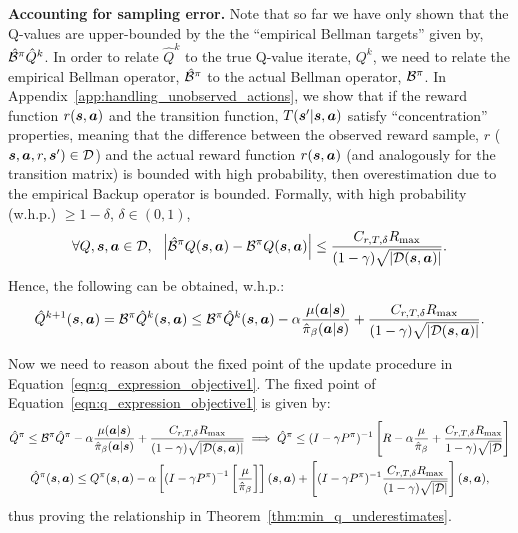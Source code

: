 \textbf{Accounting for sampling error.} Note that so far we have only shown that the Q-values are upper-bounded by the the ``empirical Bellman targets'' given by, $\hat{\mathcal{B}}^\pi \hat{Q}^k$. In order to relate $\hat{Q}^k$ to the true Q-value iterate, $Q^k$, we need to relate the empirical Bellman operator, $\hat{\mathcal{B}}^\pi$ to the actual Bellman operator, $\mathcal{B}^\pi$. In Appendix~\ref{app:handling_unobserved_actions}, we show that if the reward function $r(\boldsymbol{s}, \boldsymbol{a})$ and the transition function, $T(\boldsymbol{s}'|\boldsymbol{s}, \boldsymbol{a})$ satisfy ``concentration'' properties, meaning that the difference between the observed reward sample, $r$ ($\boldsymbol{s}, \boldsymbol{a}, r, \boldsymbol{s}') \in \mathcal{D}$) and the actual reward function $r(\boldsymbol{s}, \boldsymbol{a})$ (and analogously for the transition matrix) is bounded with high probability, then overestimation due to the empirical Backup operator is bounded. Formally, with high probability (w.h.p.) $\geq 1 - \delta$, $\delta \in (0, 1)$, 
\begin{equation*}
    \forall Q, \boldsymbol{s}, \boldsymbol{a} \in \mathcal{D},~~ \left\vert \hat{\mathcal{B}}^\pi Q(\boldsymbol{s}, \boldsymbol{a}) - \mathcal{B}^\pi Q(\boldsymbol{s}, \boldsymbol{a}) \right\vert \leq \frac{C_{r, T, \delta} R_{\max}}{(1 - \gamma) \sqrt{|\mathcal{D}(\boldsymbol{s}, \boldsymbol{a})|}}.
\end{equation*}
Hence, the following can be obtained, w.h.p.:
\begin{align}
\label{eqn:pac_bound_q_value}
    \hat{Q}^{k+1}(\boldsymbol{s}, \boldsymbol{a}) = \mathcal{B}^\pi \hat{Q}^k(\boldsymbol{s}, \boldsymbol{a}) \leq \mathcal{B}^\pi \hat{Q}^k(\boldsymbol{s}, \boldsymbol{a}) - \alpha \frac{\mu(\boldsymbol{a}|\boldsymbol{s})}{\hat{\pi}_\beta(\boldsymbol{a}|\boldsymbol{s})} + \frac{C_{r, T, \delta} R_{\max}}{(1 - \gamma) \sqrt{|\mathcal{D}(\boldsymbol{s}, \boldsymbol{a})|}}.
\end{align}

Now we need to reason about the fixed point of the update procedure in Equation~\ref{eqn:q_expression_objective1}. The fixed point of Equation~\ref{eqn:q_expression_objective1} is given by:
\begin{multline*}
    \hat{Q}^\pi \leq \mathcal{B}^\pi \hat{Q}^\pi - \alpha \frac{\mu(\boldsymbol{a}|\boldsymbol{s})}{\hat{\pi}_\beta(\boldsymbol{a}|\boldsymbol{s})} + \frac{C_{r, T, \delta} R_{\max}}{(1 - \gamma) \sqrt{|\mathcal{D}(\boldsymbol{s}, \boldsymbol{a})|}} \implies \hat{Q}^\pi \leq (I - \gamma P^\pi)^{-1} \left[ R  - \alpha \frac{\mu}{\hat{\pi}_\beta} + \frac{C_{r, T, \delta} R_{\max}}{1 - \gamma) \sqrt{|\mathcal{D}}}\right]\\
    \hat{Q}^\pi(\boldsymbol{s}, \boldsymbol{a}) \leq Q^\pi(\boldsymbol{s}, \boldsymbol{a}) - \alpha \left[ \left(I - \gamma P^\pi \right)^{-1} \left[\frac{\mu}{\hat{\pi}_\beta} \right] \right](\boldsymbol{s}, \boldsymbol{a}) + \left[(I - \gamma P^\pi)^{-1} \frac{C_{r, T, \delta} R_{\max}}{(1 - \gamma) \sqrt{|\mathcal{D}|}} \right](\boldsymbol{s}, \boldsymbol{a}),
\end{multline*}
thus proving the relationship in Theorem~\ref{thm:min_q_underestimates}.


